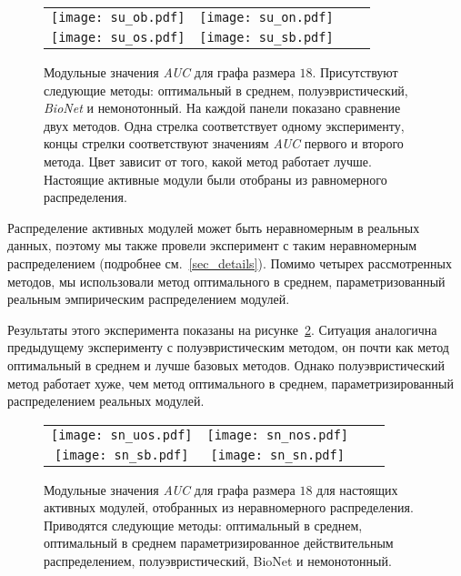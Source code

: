\begin{figure}
    \centering
    \begin{tabular}{@{}cccc@{}}
        \texttt{[image: su\_ob.pdf]} &
        \texttt{[image: su\_on.pdf]} \\
        \texttt{[image: su\_os.pdf]} &
        \texttt{[image: su\_sb.pdf]}    
    \end{tabular}
    \caption{
        Модульные значения \emph{AUC} для графа размера $18$.  Присутствуют
        следующие методы: оптимальный в среднем, полуэвристический,
        \emph{BioNet} и немонотонный.  На каждой панели показано сравнение двух
        методов.  Одна стрелка соответствует одному эксперименту, концы стрелки
        соответствуют значениям \emph{AUC} первого и второго метода. Цвет
        зависит от того, какой метод работает лучше.  Настоящие активные модули
        были отобраны из равномерного распределения.
    }%
    \label{fig:smalluni}%
\end{figure}

Распределение активных модулей может быть неравномерным в реальных данных,
поэтому мы также провели эксперимент с таким неравномерным распределением
(подробнее см.~\ref{sec_details}).  Помимо четырех рассмотренных методов, мы
использовали метод оптимального в среднем, параметризованный реальным
эмпирическим распределением модулей.

Результаты этого эксперимента показаны на рисунке~\ref{fig:smallnon}.  Ситуация
аналогична предыдущему эксперименту с полуэвристическим методом, он почти как
метод оптимальный в среднем и лучше базовых методов.  Однако полуэвристический
метод работает хуже, чем метод оптимального в среднем, параметризированный
распределением реальных модулей.

\begin{figure}
    \centering
    \begin{tabular}{@{}cccc@{}}
        \texttt{[image: sn\_uos.pdf]} &
        \texttt{[image: sn\_nos.pdf]} \\ 
        \texttt{[image: sn\_sb.pdf]} &
        \texttt{[image: sn\_sn.pdf]}    
    \end{tabular}
    \caption{
        Модульные значения \emph{AUC} для графа размера $18$ для настоящих
        активных модулей, отобранных из неравномерного распределения.
        Приводятся следующие методы: оптимальный в среднем, оптимальный
        в среднем параметризированное действительным распределением,
        полуэвристический, BioNet и немонотонный.
    }%
    \label{fig:smallnon}%
\end{figure}






